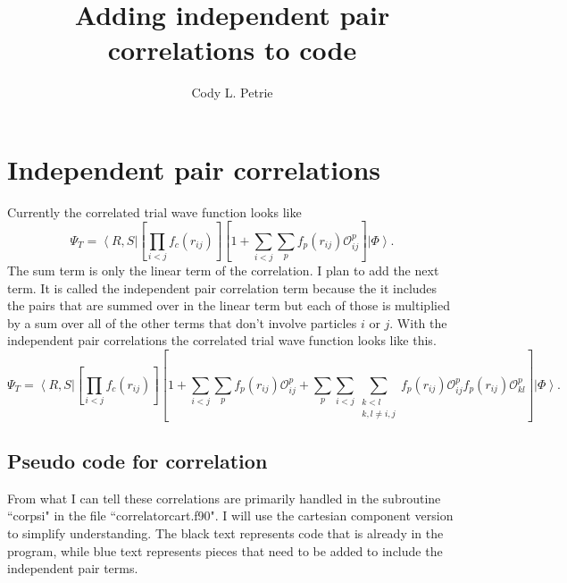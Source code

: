 \documentclass[12pt]{extarticle}
\title{Adding independent pair correlations to code}
\author{Cody L. Petrie}
\newcommand{\Oijp}{\mathcal{O}^p_{ij}}
\newcommand{\Oklp}{\mathcal{O}^p_{kl}}
\newcommand{\ket}[1]{\left| #1 \right>}
\newcommand{\bra}[1]{\left< #1 \right|}
\begin{document}
\maketitle

\section{Independent pair correlations}
Currently the correlated trial wave function looks like
\begin{equation}
  \Psi_T = \bra{R,S} \left[ \prod_{i<j}f_c(r_{ij}) \right] \left[ 1 + \sum_{i<j}\sum_p f_p(r_{ij}) \Oijp \right] \ket{\Phi}.
\end{equation}
The sum term is only the linear term of the correlation. I plan to add the next term. It is called the independent pair correlation term because the it includes the pairs that are summed over in the linear term but each of those is multiplied by a sum over all of the other terms that don't involve particles $i$ or $j$. With the independent pair correlations the correlated trial wave function looks like this.
\begin{equation}
  \Psi_T = \bra{R,S} \left[ \prod_{i<j}f_c(r_{ij}) \right] \left[ 1 + \sum_{i<j}\sum_p f_p(r_{ij}) \Oijp + \sum_p\sum_{i<j}\sum\limits_{\substack{k<l\\k,l \ne i,j}} f_p(r_{ij})\Oijp f_p(r_{ij})\Oklp \right] \ket{\Phi}.
\end{equation}

\subsection{Pseudo code for correlation}
From what I can tell these correlations are primarily handled in the subroutine ``corpsi" in the file ``correlatorcart.f90". I will use the cartesian component version to simplify understanding. The black text represents code that is already in the program, while blue text represents pieces that need to be added to include the independent pair terms.
\end{document}

